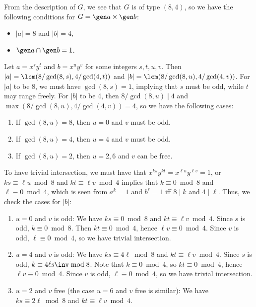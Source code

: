 \begin{solenum}[spsol]
    \item From the description of $G$, we see that $G$ is of type $(8, 4)$, so we have the following conditions for $G = \gen a \times \gen b$:
    \begin{itemize}
        \item $|a| = 8$ and $|b| = 4$,
        \item $\gen a \cap \gen b = 1$.
    \end{itemize}
    Let $a = x^s y^t$ and $b = x^u y^v$ for some integers $s, t, u, v$.
	Then $|a| = \lcm(8/\gcd(8, s), 4/\gcd(4, t))$ and $|b| = \lcm(8/\gcd(8, u), 4/\gcd(4, v))$.
	For $|a|$ to be 8, we must have $\gcd(8, s) = 1$, implying that $s$ must be odd, while $t$ may range freely.
	For $|b|$ to be 4, then $8/\gcd(8, u) \mid 4$ and $\max(8/\gcd(8, u), 4/\gcd(4, v)) = 4$, so we have the following cases:
    \begin{enumerate}[label=(\arabic*)]
        \item If $\gcd(8, u) = 8$, then $u = 0$ and $v$ must be odd.
        \item If $\gcd(8, u) = 4$, then $u = 4$ and $v$ must be odd.
        \item If $\gcd(8, u) = 2$, then $u = 2, 6$ and $v$ can be free.
    \end{enumerate}
    To have trivial intersection, we must have that $x^{ks} y^{kt} = x^{\ell u} y^{\ell v} = 1$, or $ks \equiv \ell u \bmod 8$ and $kt \equiv \ell v \bmod 4$ implies that $k \equiv 0 \bmod 8$ and $\ell \equiv 0 \bmod 4$, which is seen from $a^k = 1$ and $b^\ell = 1$ iff $8 \mid k$ and $4 \mid \ell$.
	Thus, we check the cases for $|b|$:
    \begin{enumerate}[label=(\arabic*)]
        \item $u = 0$ and $v$ is odd: We have $ks \equiv 0 \bmod 8$ and $kt \equiv \ell v \bmod 4$.
	Since $s$ is odd, $k \equiv 0 \bmod 8$.
	Then $kt \equiv 0 \bmod 4$, hence $\ell v \equiv 0 \bmod 4$.
	Since $v$ is odd, $\ell \equiv 0 \bmod 4$, so we have trivial intersection.
        \item $u = 4$ and $v$ is odd: We have $ks \equiv 4\ell \bmod 8$ and $kt \equiv \ell v \bmod 4$.
	Since $s$ is odd, $k \equiv 4\ell s\inv \bmod 8$.
	Note that $k \equiv 0 \bmod 4$, so $kt \equiv 0 \bmod 4$, hence $\ell v \equiv 0 \bmod 4$.
	Since $v$ is odd, $\ell \equiv 0 \bmod 4$, so we have trivial intersection.
        \item $u = 2$ and $v$ free (the case $u = 6$ and $v$ free is similar): We have $ks \equiv 2\ell \bmod 8$ and $kt \equiv \ell v \bmod 4$.

\end{enumerate}
\end{solenum}
